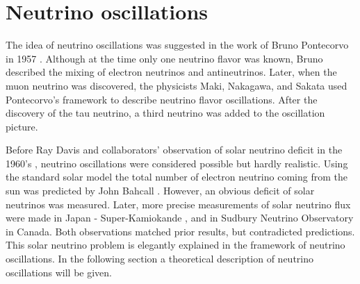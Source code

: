 \section{Neutrino oscillations}
The idea of neutrino oscillations was suggested in the work of Bruno Pontecorvo in 
1957 \cite{pontecorvo}. Although at the time only one neutrino flavor was known, 
Bruno described the mixing of electron neutrinos and antineutrinos. Later, when the muon 
neutrino was discovered, the physicists Maki, Nakagawa, and Sakata used Pontecorvo's 
framework \cite{maki} to describe neutrino flavor oscillations. After the discovery 
of the tau neutrino, a third neutrino was added to the oscillation picture.

Before Ray Davis and collaborators' observation of solar neutrino deficit in the 1960's 
\cite{davis}, neutrino oscillations were considered possible but hardly realistic. 
Using the standard solar model the total number of electron neutrino coming from the sun 
was predicted by John Bahcall \cite{bahcall}. However, an obvious deficit of solar 
neutrinos was measured. Later, more precise measurements of solar neutrino flux were 
made in Japan - Super-Kamiokande \cite{suzuki}, and in Sudbury Neutrino Observatory 
\cite{mcdonald} in Canada. Both observations matched prior results, but contradicted predictions. 
This solar neutrino problem is elegantly explained in the framework of neutrino oscillations. 
In the following section a theoretical description of neutrino oscillations will be given.

